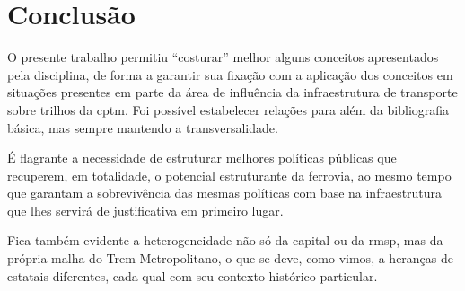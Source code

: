 	\begin{center}
	\end{center}

%
%

	\chapter{Conclusão}
	
	O presente trabalho permitiu ``costurar'' melhor alguns conceitos apresentados pela disciplina, de forma a garantir sua fixação com a aplicação dos conceitos em situações presentes em parte da área de influência da infraestrutura de transporte sobre trilhos da {\glsdesc*{cptm}}. Foi possível estabelecer relações para além da bibliografia básica, mas sempre mantendo a transversalidade.
	
	É flagrante a necessidade de estruturar melhores políticas públicas que recuperem, em totalidade, o potencial estruturante da ferrovia, ao mesmo tempo que garantam a sobrevivência das mesmas políticas com base na infraestrutura que lhes servirá de justificativa em primeiro lugar.
	
	Fica também evidente a heterogeneidade não só da capital ou da \gls{rmsp}, mas da própria malha do Trem Metropolitano, o que se deve, como vimos, a heranças de estatais diferentes, cada qual com seu contexto histórico particular.
	
	\postextual
	
	
	
